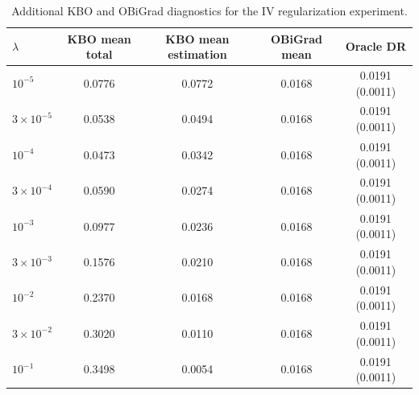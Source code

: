 \begin{table}[t]
\centering
\small
\setlength{\tabcolsep}{5pt}
\caption{Additional KBO and OBiGrad diagnostics for the IV regularization experiment.}
\label{tab:generated-iv-kbo-gradient-appendix}
\begin{tabular}{lcccc}
\toprule
$\lambda$ & KBO mean total & KBO mean estimation & OBiGrad mean & Oracle DR \\
\midrule
$10^{-5}$ & 0.0776 & 0.0772 & 0.0168 & 0.0191 (0.0011) \\
$3\times 10^{-5}$ & 0.0538 & 0.0494 & 0.0168 & 0.0191 (0.0011) \\
$10^{-4}$ & 0.0473 & 0.0342 & 0.0168 & 0.0191 (0.0011) \\
$3\times 10^{-4}$ & 0.0590 & 0.0274 & 0.0168 & 0.0191 (0.0011) \\
$10^{-3}$ & 0.0977 & 0.0236 & 0.0168 & 0.0191 (0.0011) \\
$3\times 10^{-3}$ & 0.1576 & 0.0210 & 0.0168 & 0.0191 (0.0011) \\
$10^{-2}$ & 0.2370 & 0.0168 & 0.0168 & 0.0191 (0.0011) \\
$3\times 10^{-2}$ & 0.3020 & 0.0110 & 0.0168 & 0.0191 (0.0011) \\
$10^{-1}$ & 0.3498 & 0.0054 & 0.0168 & 0.0191 (0.0011) \\
\bottomrule
\end{tabular}
\end{table}
